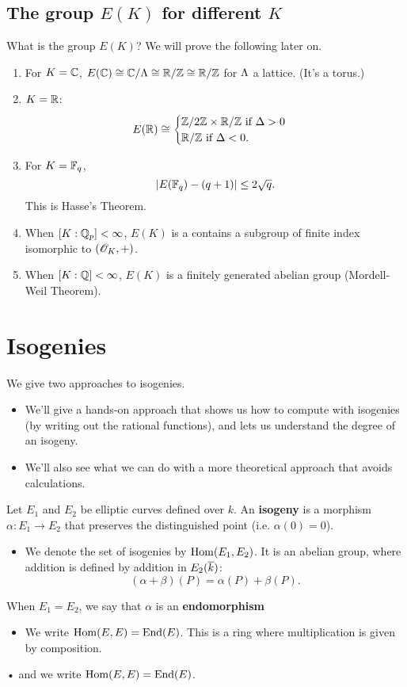 \subsection{The group $E(K)$ for different $K$}
What is the group $E(K)$? We will prove the following later on.
\begin{enumerate}
\item
For $K=\mathbb{C}$, $E(\mathbb{C})\cong \mathbb{C}/\Lambda\cong \mathbb{R}/\mathbb{Z}\cong \mathbb{R}/\mathbb{Z}$ for $\Lambda$ a lattice. (It's a torus.)
\item
$K=\mathbb{R}$: 
\[E(\mathbb{R})\cong 
\begin{cases}
\mathbb{Z}/2\mathbb{Z}\times \mathbb{R}/\mathbb{Z}\text{ if }\Delta>0\\
\mathbb{R}/\mathbb{Z}\text{ if }\Delta<0.
\end{cases}
\]
\item For $K=\mathbb{F}_q$,
\[
|E(\mathbb{F}_q)-(q+1)|\le2\sqrt q.
\]
This is Hasse's Theorem.
\item When $[K:\mathbb{Q}_p]<\infty$, $E(K)$ is a contains a subgroup of finite index isomorphic to $(\mathscr{O}_K,+)$. 
\item When $[K:\mathbb{Q}]<\infty$, $E(K)$ is a finitely generated abelian group (Mordell-Weil Theorem).
\end{enumerate}


\section{Isogenies}
We give two approaches to isogenies. 
\begin{itemize}
\item
We'll give a hands-on approach that shows us how to compute with isogenies (by writing out the rational functions), and lets us understand the degree of an isogeny.
\item
We'll also see what we can do with a more theoretical approach that avoids calculations.
\end{itemize}

\begin{df} 
Let $E_1$ and $E_2$ be elliptic curves defined over $k$.  An \textbf{isogeny} is a morphism $\alpha\colon E_1\to E_2$ that preserves the distinguished point (i.e. $\alpha(0) = 0$). 
\begin{itemize}
\item
We denote the set of isogenies by $\operatorname{Hom}(E_1,E_2)$. It is an abelian group, where addition is defined by addition in $E_2(\overline{k})$:
$$(\alpha + \beta)(P)=\alpha(P)+\beta(P).$$
\end{itemize}

When $E_1 = E_2$, we say that $\alpha$ is an \textbf{endomorphism}
\begin{itemize}
\item
We write $\operatorname{Hom}(E,E)= \operatorname{End}(E)$. This is a ring where multiplication is given by composition.
\end{itemize}•
 and we write $\operatorname{Hom}(E,E)= \operatorname{End}(E)$.
\end{df}

